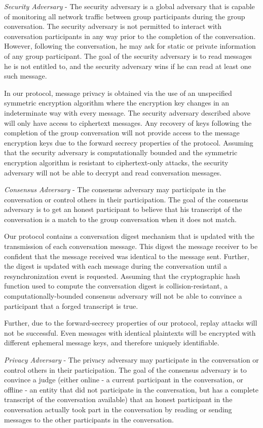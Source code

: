 \documentclass[%
preprint,
amsmath,amssymb,
aps,
prb,
floatfix,
]{revtex4-1}
\begin{document}
\textit{Security Adversary} - The security adversary is a global adversary that
is capable of monitoring all network traffic between group participants during
the group conversation.  The security adversary is not permitted to interact
with conversation participants in any way prior to the completion of the
conversation. However, following the conversation, he may ask for static or
private information of any group participant.
The goal of the security adversary is to read
messages he is not entitled to, and the security adversary wins if he can read
at least one such message.

In our protocol, message privacy is obtained via the use of an unspecified
symmetric encryption algorithm where the encryption key changes in an
indeterminate way with every message. The security adversary described
above will only have access to ciphertext messages. Any recovery of keys
following the completion of the group conversation will not provide access to
the message encryption keys due to the forward secrecy properties of the
protocol. Assuming that the security adversary is computationally bounded and
the symmetric encryption algorithm is resistant to ciphertext-only attacks, the
security adversary will not be able to decrypt and read conversation messages.

\textit{Consensus Adversary} - The consensus adversary may participate in the
conversation or control others in their participation. The goal of the consensus
adversary is to get an honest participant to believe that his transcript of the
conversation is a match to the group conversation when it does not match.

Our protocol contains a conversation digest mechanism that is updated with the
transmission of each conversation message. This digest the message receiver to
be confident that the message received was identical to the message sent.
Further, the digest is updated with each message during the conversation until a
resynchronization event is requested. Assuming that the cryptographic hash
function used to compute the conversation digest is collision-resistant, a
computationally-bounded consensus adversary will not be able to convince a
participant that a forged transcript is true.

Further, due to the forward-secrecy properties of our protocol, replay attacks
will not be successful. Even messages with identical plaintexts will be
encrypted with different ephemeral message keys, and therefore uniquely
identifiable.

\textit{Privacy Adversary} - The privacy adversary may participate in the
conversation or control others in their participation. The goal of the consensus
adversary is to convince a judge (either online - a current participant in the
conversation, or offline - an entity that did not participate in the
conversation, but has a complete transcript of the conversation available)
that an honest participant in the conversation actually took part in the
conversation by reading or sending messages to the other participants in the
conversation.
\end{document}
